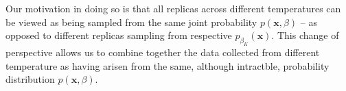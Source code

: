 Our motivation in doing so is that all replicas across different temperatures can be viewed as being sampled from the same joint probability $p(\mathbf{x},\beta)$ -- as opposed to different replicas sampling from respective $p_{\beta_K}(\mathbf{x})$. This change of perspective allows us to combine together the data collected from different temperature as having arisen from the same, although intractble, probability distribution $p(\mathbf{x},\beta)$. 
